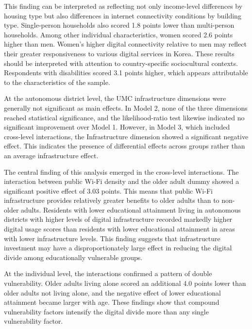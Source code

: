 This finding can be interpreted as reflecting not only income-level differences by housing type but also differences in internet connectivity conditions by building type. Single-person households also scored 1.8 points lower than multi-person households. Among other individual characteristics, women scored 2.6 points higher than men. Women's higher digital connectivity relative to men may reflect their greater responsiveness to various digital services in Korea. These results should be interpreted with attention to country-specific sociocultural contexts. Respondents with disabilities scored 3.1 points higher, which appears attributable to the characteristics of the sample.

At the autonomous district level, the UMC infrastructure dimensions were generally not significant as main effects. In Model 2, none of the three dimensions reached statistical significance, and the likelihood-ratio test likewise indicated no significant improvement over Model 1. However, in Model 3, which included cross-level interactions, the Infrastructure dimension showed a significant negative effect. This indicates the presence of differential effects across groups rather than an average infrastructure effect.

The central finding of this analysis emerged in the cross-level interactions. The interaction between public Wi-Fi density and the older adult dummy showed a significant positive effect of 3.03 points. This means that public Wi-Fi infrastructure provides relatively greater benefits to older adults than to non-older adults. Residents with lower educational attainment living in autonomous districts with higher levels of digital infrastructure recorded markedly higher digital usage scores than residents with lower educational attainment in areas with lower infrastructure levels. This finding suggests that infrastructure investment may have a disproportionately large effect in reducing the digital divide among educationally vulnerable groups.

At the individual level, the interactions confirmed a pattern of double vulnerability. Older adults living alone scored an additional 4.0 points lower than older adults not living alone, and the negative effect of lower educational attainment became larger with age. These findings show that compound vulnerability factors intensify the digital divide more than any single vulnerability factor.


